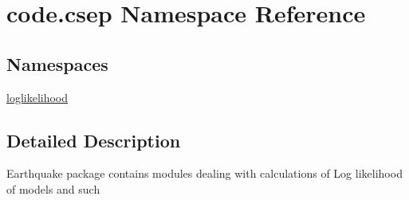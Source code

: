 \hypertarget{namespacecode_1_1csep}{}\section{code.\+csep Namespace Reference}
\label{namespacecode_1_1csep}
\subsection*{Namespaces}
\begin{DoxyCompactItemize}
\item 
 \hyperlink{namespacecode_1_1csep_1_1loglikelihood}{loglikelihood}
\end{DoxyCompactItemize}


\subsection{Detailed Description}
\begin{DoxyVerb}Earthquake package contains modules dealing with calculations of Log likelihood of models and such
\end{DoxyVerb}
 